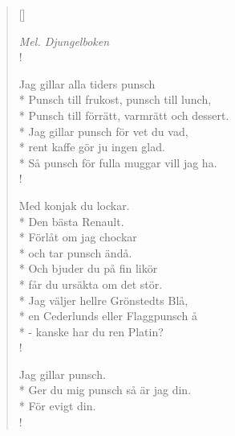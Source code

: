 
\settowidth{\versewidth}{Punsch till frukost, punsch till lunch,}



\begin{verse}[\versewidth]

\flagverse{}
\emph{Mel. Djungelboken}\\!


Jag gillar alla tiders punsch\\*
Punsch till frukost, punsch till lunch,\\*
Punsch till förrätt, varmrätt och dessert.\\*
Jag gillar punsch för vet du vad,\\*
rent kaffe gör ju ingen glad.\\*
Så punsch för fulla muggar vill jag ha.\\!


Med konjak du lockar.\\*
Den bästa Renault.\\*
Förlåt om jag chockar\\*
och tar punsch ändå.\\*
Och bjuder du på fin likör\\*
får du ursäkta om det stör.\\*
Jag väljer hellre Grönstedts Blå,\\*
en Cederlunds eller Flaggpunsch å\\*
- kanske har du ren Platin?\\!


Jag gillar punsch.\\*
Ger du mig punsch så är jag din.\\*
För evigt din.\\!


\end{verse}

